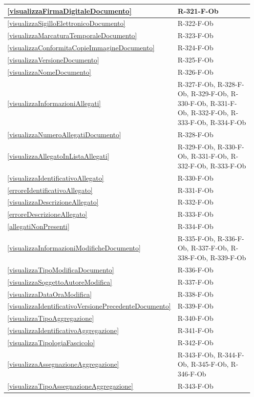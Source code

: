\begin{longtable}{|p{4cm}|p{10cm}|}
\hline
\ref{visualizzaFirmaDigitaleDocumento} & R-321-F-Ob \\
\hline
\ref{visualizzaSigilloElettronicoDocumento} & R-322-F-Ob \\
\hline
\ref{visualizzaMarcaturaTemporaleDocumento} & R-323-F-Ob \\
\hline
\ref{visualizzaConformitaCopieImmagineDocumento} & R-324-F-Ob \\
\hline
\ref{visualizzaVersioneDocumento} & R-325-F-Ob \\
\hline
\ref{visualizzaNomeDocumento} & R-326-F-Ob \\
\hline
\ref{visualizzaInformazioniAllegati} & R-327-F-Ob, R-328-F-Ob, R-329-F-Ob, R-330-F-Ob, R-331-F-Ob, R-332-F-Ob, R-333-F-Ob, R-334-F-Ob \\
\hline
\ref{visualizzaNumeroAllegatiDocumento} & R-328-F-Ob \\
\hline
\ref{visualizzaAllegatoInListaAllegati} & R-329-F-Ob, R-330-F-Ob, R-331-F-Ob, R-332-F-Ob, R-333-F-Ob \\
\hline
\ref{visualizzaIdentificativoAllegato} & R-330-F-Ob \\
\hline
\ref{erroreIdentificativoAllegato} & R-331-F-Ob \\
\hline
\ref{visualizzaDescrizioneAllegato} & R-332-F-Ob \\
\hline
\ref{erroreDescrizioneAllegato} & R-333-F-Ob \\
\hline
\ref{allegatiNonPresenti} & R-334-F-Ob \\
\hline
\ref{visualizzaInformazioniModificheDocumento} & R-335-F-Ob, R-336-F-Ob, R-337-F-Ob, R-338-F-Ob, R-339-F-Ob \\
\hline
\ref{visualizzaTipoModificaDocumento} & R-336-F-Ob \\
\hline
\ref{visualizzaSoggettoAutoreModifica} & R-337-F-Ob \\
\hline
\ref{visualizzaDataOraModifica} & R-338-F-Ob \\
\hline
\ref{visualizzaIdentificativoVersionePrecedenteDocumento} & R-339-F-Ob \\
\hline
\ref{visualizzaTipoAggregazione} & R-340-F-Ob \\
\hline
\ref{visualizzaIdentificativoAggregazione} & R-341-F-Ob \\
\hline
\ref{visualizzaTipologiaFascicolo} & R-342-F-Ob \\
\hline
\ref{visualizzaAssegnazioneAggregazione} & R-343-F-Ob, R-344-F-Ob, R-345-F-Ob, R-346-F-Ob \\
\hline
\ref{visualizzaTipoAssegnazioneAggregazione} & R-343-F-Ob \\

\end{longtable}
